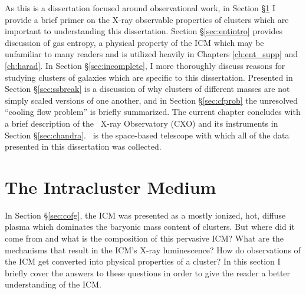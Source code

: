 As this is a dissertation focused around observational work, in
Section \S\ref{sec:icm} I provide a brief primer on the X-ray
observable properties of clusters which are important to understanding
this dissertation. Section \S\ref{sec:entintro} provides discussion of
gas entropy, a physical property of the ICM which may be unfamiliar to
many readers and is utilized heavily in Chapters \ref{ch:ent_supp} and
\ref{ch:harad}. In Section \S\ref{sec:incomplete}, I more thoroughly
discuss reasons for studying clusters of galaxies which are specific
to this dissertation. Presented in Section \S\ref{sec:ssbreak} is a
discussion of why clusters of different masses are not simply scaled
versions of one another, and in Section \S\ref{sec:cfprob} the
unresolved ``cooling flow problem'' is briefly summarized. The current
chapter concludes with a brief description of the \chandra\ X-ray
Observatory (CXO) and its instruments in Section
\S\ref{sec:chandra}. \chandra\ is the space-based telescope with which
all of the data presented in this dissertation was collected.

\section{The Intracluster Medium}
\label{sec:icm}

In Section \S\ref{sec:cofg}, the ICM was presented as a mostly
ionized, hot, diffuse plasma which dominates the baryonic mass content
of clusters. But where did it come from and what is the composition of
this pervasive ICM? What are the mechanisms that result in the ICM's
X-ray luminescence? How do observations of the ICM get converted into
physical properties of a cluster? In this section I briefly cover the
answers to these questions in order to give the reader a better
understanding of the ICM.

